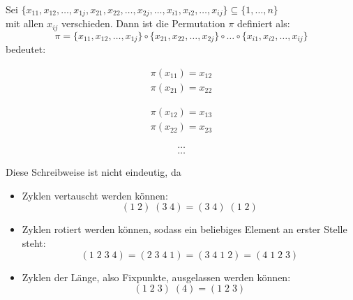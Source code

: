 \documentclass{article}
\begin{document}
Sei $\{x_{11}, x_{12}, \dots, x_{1j}, x_{21}, x_{22}, \dots, x_{2j}, \dots, x_{i1}, x_{i2}, \dots, x_{ij}\} \subseteq \{1, \dots, n\}$\\ mit allen $x_{ij}$ verschieden. Dann ist die Permutation $\pi$ definiert als:
\begin{equation*}
    \pi = \{x_{11}, x_{12}, \dots, x_{1j}\} \circ \{x_{21}, x_{22}, \dots, x_{2j}\} \circ \dots \circ \{x_{i1}, x_{i2}, \dots, x_{ij}\}
\end{equation*}
bedeutet:
\begin{center}
    \begin{minipage}{3cm}
        \begin{equation*}
            \begin{split}
                \pi(x_{11}) = x_{12}\\
                \pi(x_{21}) = x_{22}
            \end{split}
        \end{equation*}
    \end{minipage}
    \begin{minipage}{3cm}
        \begin{equation*}
            \begin{split}
                \pi(x_{12}) = x_{13}\\
                \pi(x_{22}) = x_{23}
            \end{split}
        \end{equation*}
    \end{minipage}
    \begin{minipage}{3cm}
        \begin{equation*}
            \begin{split}
                \dots\\
                \dots
            \end{split}
        \end{equation*}
    \end{minipage}
\end{center}

Diese Schreibweise ist nicht eindeutig, da
\begin{itemize}
    \item Zyklen vertauscht werden können:
    \begin{equation*}
        (1 \; 2) \; (3 \; 4) = (3 \; 4) \; (1 \; 2)
    \end{equation*}
    \item  Zyklen rotiert werden können, sodass ein beliebiges Element an erster Stelle steht:
    \begin{equation*}
        (1 \; 2 \; 3 \; 4) = (2 \; 3 \; 4 \; 1) = (3 \; 4 \; 1 \; 2) = (4 \; 1 \; 2 \; 3)
    \end{equation*}
    \item Zyklen der Länge, also Fixpunkte, ausgelassen werden können:
    \begin{equation*}
        (1 \; 2 \; 3) \; (4) = (1 \; 2 \; 3)
    \end{equation*}
\end{itemize}
\end{document}
